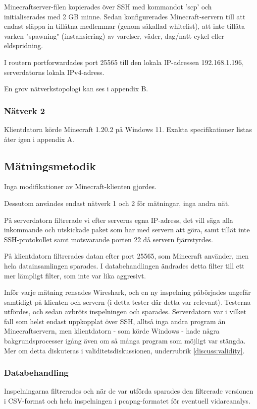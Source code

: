 \documentclass[journal,comsoc]{IEEEtran}
\begin{document}
Minecraftserver-filen kopierades över SSH med kommandot 'scp' och initialiserades med 2 GB minne. Sedan konfigurerades Minecraft-servern till att endast släppa in tillåtna medlemmar (genom såkallad whitelist), att inte tillåta varken "spawning" (instansiering) av varelser, väder, dag/natt cykel eller eldspridning. 

I routern portforwardades port 25565 till den lokala IP-adressen 192.168.1.196, serverdatorns lokala IPv4-adress. 

En grov nätverkstopologi kan ses i appendix B.

\subsubsection{Nätverk 2}
Klientdatorn körde Minecraft 1.20.2 på Windows 11. Exakta specifikationer listas åter igen i appendix A.

\subsection{Mätningsmetodik}
Inga modifikationer av Minecraft-klienten gjordes. 

Dessutom användes endast nätverk 1 och 2 för mätningar, inga andra nät.

På serverdatorn filtrerade vi efter serverns egna IP-adress, det vill säga alla inkommande och utskickade paket som har med servern att göra, samt tillät inte SSH-protokollet samt motsvarande porten 22 då servern fjärrstyrdes. 

På klientdatorn filtrerades datan efter port 25565, som Minecraft använder, men hela datainsamlingen sparades. I databehandlingen ändrades detta filter till ett mer lämpligt filter, som inte var lika aggresivt.

Inför varje mätning rensades Wireshark, och en ny inspelning påbörjades ungefär samtidigt på klienten och servern (i detta tester där detta var relevant). Testerna utfördes, och sedan avbröts inspelningen och sparades. Serverdatorn var i vilket fall som helst endast uppkopplat över SSH, alltså inga andra program än Minecraftservern, men klientdatorn - som körde Windows - hade några bakgrundsprocesser igång även om så många program som möjligt var stängda. Mer om detta diskuteras i validitetsdiskussionen, underrubrik \ref{discuss:validity}.
\subsubsection{Databehandling}
Inspelningarna filtrerades och när de var utförda sparades den filtrerade versionen i CSV-format och hela inspelningen i pcapng-formatet för eventuell vidareanalys.
\end{document}
